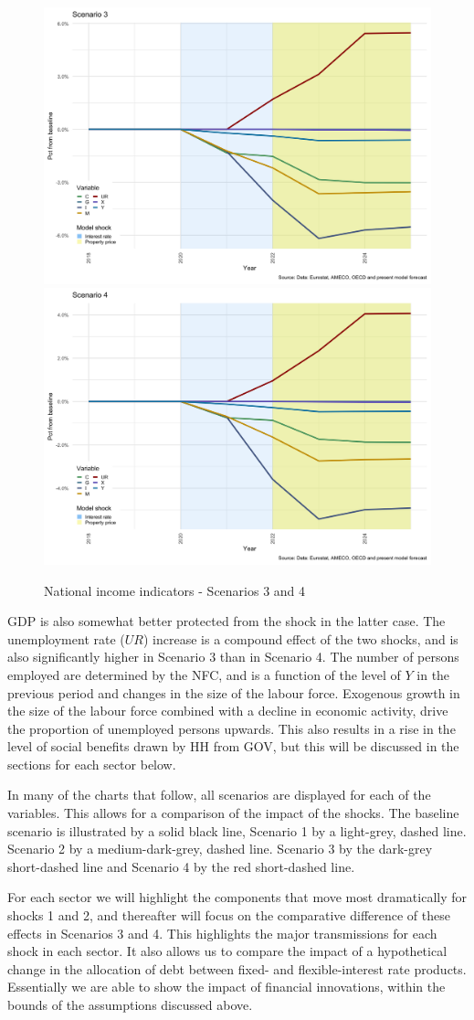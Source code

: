 \documentclass[
]{book}
\begin{document}
\begin{figure}[H]
\includegraphics[width=0.5\linewidth]{figures/fl-fi-sfc-plot-gdp-indicators-s3-s4-1} \includegraphics[width=0.5\linewidth]{figures/fl-fi-sfc-plot-gdp-indicators-s3-s4-2} \caption{National income indicators - Scenarios 3 and 4}\label{fig:fl-fi-sfc-plot-gdp-indicators-s3-s4}
\end{figure}

GDP is also somewhat better protected from the shock in the latter case. The unemployment rate (\(UR\)) increase is a compound effect of the two shocks, and is also significantly higher in Scenario 3 than in Scenario 4. The number of persons employed are determined by the NFC, and is a function of the level of \(Y\) in the previous period and changes in the size of the labour force. Exogenous growth in the size of the labour force combined with a decline in economic activity, drive the proportion of unemployed persons upwards. This also results in a rise in the level of social benefits drawn by HH from GOV, but this will be discussed in the sections for each sector below.

In many of the charts that follow, all scenarios are displayed for each of the variables. This allows for a comparison of the impact of the shocks. The baseline scenario is illustrated by a solid black line, Scenario 1 by a light-grey, dashed line. Scenario 2 by a medium-dark-grey, dashed line. Scenario 3 by the dark-grey short-dashed line and Scenario 4 by the red short-dashed line.

For each sector we will highlight the components that move most dramatically for shocks 1 and 2, and thereafter will focus on the comparative difference of these effects in Scenarios 3 and 4. This highlights the major transmissions for each shock in each sector. It also allows us to compare the impact of a hypothetical change in the allocation of debt between fixed- and flexible-interest rate products. Essentially we are able to show the impact of financial innovations, within the bounds of the assumptions discussed above.
\end{document}
